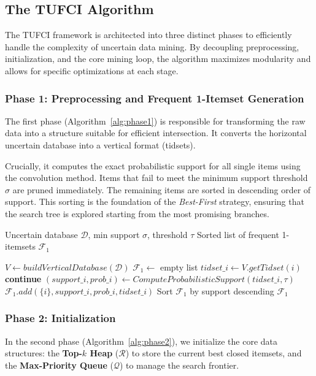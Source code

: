 \documentclass[10pt,letterpaper]{article}
\begin{document}
\subsection*{The TUFCI Algorithm}

The TUFCI framework is architected into three distinct phases to efficiently handle the complexity of uncertain data mining. By decoupling preprocessing, initialization, and the core mining loop, the algorithm maximizes modularity and allows for specific optimizations at each stage.

\subsubsection*{Phase 1: Preprocessing and Frequent 1-Itemset Generation}
The first phase (Algorithm~\ref{alg:phase1}) is responsible for transforming the raw data into a structure suitable for efficient intersection. It converts the horizontal uncertain database into a vertical format (tidsets). 

Crucially, it computes the exact probabilistic support for all single items using the convolution method. Items that fail to meet the minimum support threshold $\sigma$ are pruned immediately. The remaining items are sorted in descending order of support. This sorting is the foundation of the \textit{Best-First} strategy, ensuring that the search tree is explored starting from the most promising branches.

\begin{algorithm}[H]
\caption{Phase 1: Preprocessing}
\label{alg:phase1}
\begin{algorithmic}[1]
\footnotesize
\REQUIRE Uncertain database $\mathcal{D}$, min support $\sigma$, threshold $\tau$
\ENSURE Sorted list of frequent 1-itemsets $\mathcal{F}_1$

\STATE $V \leftarrow buildVerticalDatabase(\mathcal{D})$
\STATE $\mathcal{F}_1 \leftarrow$ empty list
    \STATE $tidset\_i \leftarrow V.getTidset(i)$
     \STATE \textbf{continue} \ENDIF
    \STATE $(support\_i, prob\_i) \leftarrow ComputeProbabilisticSupport(tidset\_i, \tau)$
        \STATE $\mathcal{F}_1.add(\{i\}, support\_i, prob\_i, tidset\_i)$
    \ENDIF
\ENDFOR
\STATE Sort $\mathcal{F}_1$ by support descending
\RETURN $\mathcal{F}_1$
\end{algorithmic}
\end{algorithm}

\subsubsection*{Phase 2: Initialization}
In the second phase (Algorithm~\ref{alg:phase2}), we initialize the core data structures: the \textbf{Top-$k$ Heap} ($\mathcal{R}$) to store the current best closed itemsets, and the \textbf{Max-Priority Queue} ($\mathcal{Q}$) to manage the search frontier. 
\end{document}
